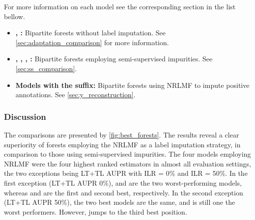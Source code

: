 For more information on each model see the corresponding section in the list bellow.

\begin{itemize}
    \item \textbf{, :}
    Bipartite forests without label imputation.
    See \autoref{sec:adaptation_comparison} for more information.
    \item \textbf{, , , :}
    Bipartite forests employing semi-supervised impurities.
    See \autoref{sec:ss_comparison}.
    \item \textbf{Models with the  suffix:} 
    Bipartite forests using NRLMF to impute positive annotations.
    See \autoref{sec:y_reconstruction}.
\end{itemize}



\subsubsection{Discussion}

The comparisons are presented by \autoref{fig:best_forests}. The results reveal a clear superiority of forests employing the NRLMF as a label imputation strategy, in comparison to those using semi-supervised impurities. The four models employing NRLMF were the four highest ranked estimators in almost all evaluation settings, the two exceptions being LT+TL AUPR with ILR = 0\% and ILR = 50\%. In the first exception (LT+TL AUPR 0\%),  and  are the two worst-performing models, whereas  and  are the first and second best, respectively. In the second exception (LT+TL AUPR 50\%), the two best models are the same, and  is still one the worst performers. However,  jumps to the third best position. 

